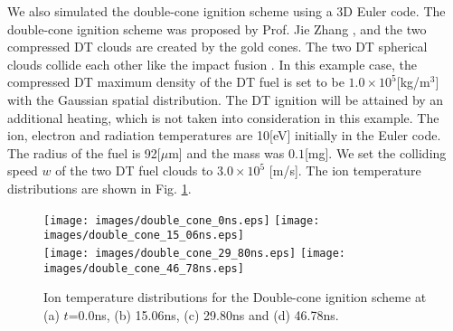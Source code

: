 We also simulated the double-cone ignition scheme\cite{Double-cone} using a 3D Euler code. The double-cone ignition scheme was proposed by Prof. Jie Zhang \cite{Double-cone}, and the two compressed DT clouds are created by the gold cones. The two DT spherical clouds collide each other like the impact fusion \cite{Winterberg}. In this example case, the compressed DT maximum density of the DT fuel is set to be $1.0\times 10^5$[kg/m$^3$] with the Gaussian spatial distribution. The DT ignition will be attained by an additional heating, which is not taken into consideration in this example. The ion, electron and radiation temperatures are 10[eV] initially in the Euler code. The radius of the fuel is 92[$\mu$m] and the mass was $0.1$[mg]. We set the colliding speed $w$ of the two DT fuel clouds to $3.0\times10^5$ [m/s]. The ion temperature distributions are shown in Fig. \ref{Double_cone_Ti}.


\begin{figure}[H]
		\centering
		\texttt{[image: images/double\_cone\_0ns.eps]}
		\texttt{[image: images/double\_cone\_15\_06ns.eps]} \\
		\texttt{[image: images/double\_cone\_29\_80ns.eps]}
		\texttt{[image: images/double\_cone\_46\_78ns.eps]} \\
		\caption{Ion temperature distributions for the Double-cone ignition scheme \cite{Double-cone} at (a) $t$=0.0ns, (b) 15.06ns, (c) 29.80ns and (d) 46.78ns.}\label{Double_cone_Ti}
\end{figure}

	
%